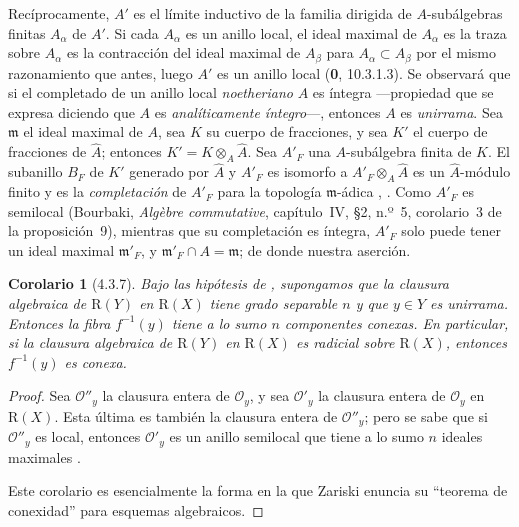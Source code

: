\documentclass[10pt,oneside,openany]{book}
\theoremstyle{egaenv}\newtheorem*{env}{---}
\theoremstyle{egastatement}
\newtheorem*{corollary}{Corolario}
\theoremstyle{egadescription}
\begin{document}
Recíprocamente, $A'$ es el límite inductivo de la familia dirigida de
$A$-subálgebras finitas $A_\alpha$ de $A'$. Si cada $A_\alpha$ es un anillo local, el ideal maximal
de $A_\alpha$ es la traza sobre $A_\alpha$ es la contracción del ideal maximal de $A_\beta$ para
$A_\alpha\subset A_\beta$ por el mismo razonamiento que antes, luego $A'$ es un anillo local (\textbf{0}, 10.3.1.3). Se observará que si el completado de un anillo local \emph{noetheriano} $A$ es íntegra ---propiedad que se expresa diciendo que
$A$ es \emph{analíticamente íntegro}---, entonces $A$ es \emph{unirrama}.
Sea $\mathfrak m$ el ideal maximal de $A$, sea $K$ su cuerpo de
fracciones, y sea $K'$ el cuerpo de fracciones de $\widehat A$;
entonces
$K'=K\otimes_A\widehat A$.
Sea $A'_F$ una $A$-subálgebra finita de $K$. El subanillo $B_F$ de
$K'$ generado por $\widehat A$ y $A'_F$ es isomorfo a
$A'_F\otimes_A\widehat A$
es un $\widehat A$-módulo finito y es la \emph{completación} de $A'_F$
para la topología $\mathfrak m$-ádica
, . Como $A'_F$ es semilocal
(Bourbaki, \emph{Alg\`ebre commutative}, capítulo~IV, \S2, n.º~5,
corolario~3 de la proposición~9), mientras que su completación es
íntegra, $A'_F$ solo puede tener un ideal maximal $\mathfrak m'_F$, y
$\mathfrak m'_F\cap A=\mathfrak m$; de donde nuestra aserción.
\begin{corollary}[4.3.7]
\label{III.4.3.7}
\label{III.4.3.7-fr}
Bajo las hipótesis de , supongamos que la clausura
algebraica de $\mathrm R(Y)$ en $\mathrm R(X)$ tiene grado separable
$n$ y que $y\in Y$ es unirrama. Entonces la fibra $f^{-1}(y)$ tiene a
lo sumo $n$ componentes conexas. En particular, si la clausura
algebraica de $\mathrm R(Y)$ en $\mathrm R(X)$ es radicial sobre
$\mathrm R(X)$, entonces $f^{-1}(y)$ es conexa.
\end{corollary}

\begin{proof}
Sea $\mathcal O''_y$ la clausura entera de $\mathcal O_y$, y sea
$\mathcal O'_y$ la clausura entera de $\mathcal O_y$ en $\mathrm R(X)$.
Esta última es también la clausura entera de $\mathcal O''_y$; pero se sabe que si $\mathcal O''_y$ es local, entonces $\mathcal O'_y$ es
un anillo semilocal que tiene a lo sumo $n$ ideales maximales
\cite[vol.~I, p.~289, Theorem~22]{I-13}.

Este corolario es esencialmente la forma en la que Zariski enuncia su
``teorema de conexidad'' para esquemas algebraicos.
\end{proof}
\end{document}
